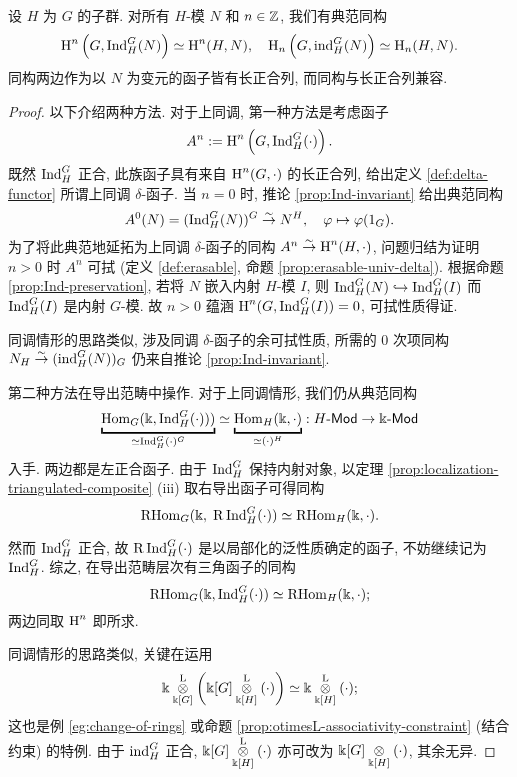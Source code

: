 \begin{theorem}\label{prop:Shapiro}
	设 $H$ 为 $G$ 的子群. 对所有 $H$-模 $N$ 和 $n \in \Z$, 我们有典范同构
	\[ \Hm^n\left(G, \Ind^G_H(N)\right) \simeq \Hm^n(H, N), \quad \Hm_n\left(G, \iInd^G_H(N)\right) \simeq \Hm_n(H, N). \]
	同构两边作为以 $N$ 为变元的函子皆有长正合列, 而同构与长正合列兼容.
\end{theorem}
\begin{proof}
	以下介绍两种方法. 对于上同调, 第一种方法是考虑函子
	\[ A^n := \Hm^n\left(G, \Ind^G_H(\cdot)\right). \]
	既然 $\Ind^G_H$ 正合, 此族函子具有来自 $\Hm^n(G, \cdot)$ 的长正合列, 给出定义 \ref{def:delta-functor} 所谓上同调 $\delta$-函子. 当 $n = 0$ 时, 推论 \ref{prop:Ind-invariant} 给出典范同构
	\[ A^0(N) = (\Ind^G_H(N))^G \rightiso N^H, \quad \varphi \mapsto \varphi(1_G). \]
	为了将此典范地延拓为上同调 $\delta$-函子的同构 $A^n \rightiso \Hm^n(H, \cdot)$, 问题归结为证明 $n >0 $ 时 $A^n$ 可拭 (定义 \ref{def:erasable}, 命题 \ref{prop:erasable-univ-delta}). 根据命题 \ref{prop:Ind-preservation}, 若将 $N$ 嵌入内射 $H$-模 $I$, 则 $\Ind^G_H(N) \hookrightarrow \Ind^G_H(I)$ 而 $\Ind^G_H(I)$ 是内射 $G$-模. 故 $n > 0$ 蕴涵 $\Hm^n(G, \Ind^G_H(I)) = 0$, 可拭性质得证.
	
	同调情形的思路类似, 涉及同调 $\delta$-函子的余可拭性质, 所需的 $0$ 次项同构 $N_H \rightiso (\iInd^G_H(N))_G$ 仍来自推论 \ref{prop:Ind-invariant}.
	
	第二种方法在导出范畴中操作. 对于上同调情形, 我们仍从典范同构
	\[ \underbracket{\Hom_G(\Bbbk, \Ind^G_H(\cdot)))}_{\simeq \Ind^G_H(\cdot)^G} \simeq \underbracket{\Hom_H(\Bbbk, \cdot)}_{\simeq (\cdot)^H} : H\dcate{Mod} \to \Bbbk\dcate{Mod} \]
	入手. 两边都是左正合函子. 由于 $\Ind^G_H$ 保持内射对象, 以定理 \ref{prop:localization-triangulated-composite} (iii) 取右导出函子可得同构
	\begin{equation*}
		\RHom_G(\Bbbk, \; \mathrm{R}\Ind^G_H(\cdot)) \simeq \RHom_H(\Bbbk, \cdot).
	\end{equation*}
	
	然而 $\Ind^G_H$ 正合, 故 $\mathrm{R}\Ind^G_H(\cdot)$ 是以局部化的泛性质确定的函子, 不妨继续记为 $\Ind^G_H$. 综之, 在导出范畴层次有三角函子的同构
	\[ \RHom_G(\Bbbk, \Ind^G_H(\cdot)) \simeq \RHom_H(\Bbbk, \cdot); \]
	两边同取 $\Hm^n$ 即所求.
	
	同调情形的思路类似, 关键在运用
	\[ \Bbbk \otimesL[{\Bbbk[G]}] \left( \Bbbk[G] \otimesL[{\Bbbk[H]}] (\cdot) \right) \simeq \Bbbk \otimesL[{\Bbbk[H]}] (\cdot); \]
	这也是例 \ref{eg:change-of-rings} 或命题 \ref{prop:otimesL-associativity-constraint} (结合约束) 的特例. 由于 $\iInd^G_H$ 正合, $\Bbbk[G] \otimesL[{\Bbbk[H]}] (\cdot)$ 亦可改为 $\Bbbk[G] \dotimes{\Bbbk[H]} (\cdot)$, 其余无异.
\end{proof}

